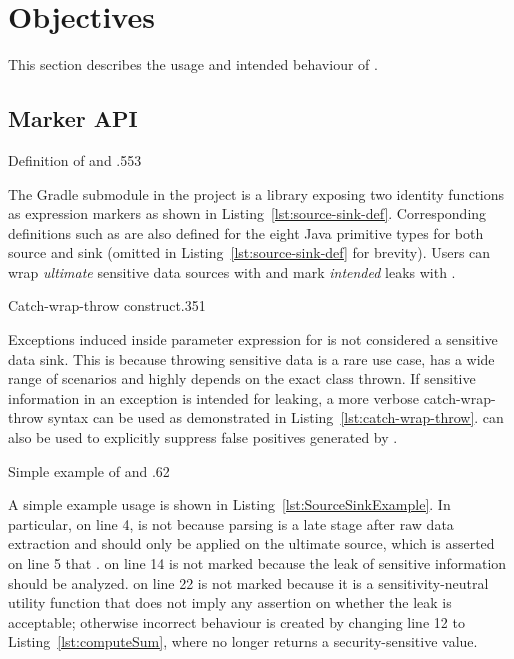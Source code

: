\section{Objectives}\label{sec:objectives}
This section describes the usage and intended behaviour of \pname{}.

\subsection{Marker API}\label{subsec:marker-api}
{Definition of  and }{.55}{3}

The  Gradle submodule in the project
is a library exposing two identity functions as expression markers
as shown in Listing~\ref{lst:source-sink-def}.
Corresponding definitions such as 
are also defined for the eight Java primitive types
for both source and sink (omitted in Listing~\ref{lst:source-sink-def} for brevity).
Users can wrap \emph{ultimate} sensitive data sources with 
and mark \emph{intended} leaks with .

{Catch-wrap-throw construct}{.35}{1}

Exceptions induced inside parameter expression for 
is not considered a sensitive data sink.
This is because throwing sensitive data is a rare use case,
has a wide range of scenarios
and highly depends on the exact class thrown.
If sensitive information in an exception is intended for leaking,
a more verbose catch-wrap-throw syntax can be used
as demonstrated in Listing~\ref{lst:catch-wrap-throw}.
 can also be used to explicitly suppress false positives generated by \pname{}.

{Simple example of  and }{.6}{2}

A simple example usage is shown in Listing~\ref{lst:SourceSinkExample}.
In particular, on line 4,  is not 
because parsing is a late stage after raw data extraction
and  should only be applied on the ultimate source,
which is asserted on line 5 that .
 on line 14 is not marked 
because the leak of sensitive information should be analyzed.
 on line 22 is not marked 
because it is a sensitivity-neutral utility function
that does not imply any assertion on whether the leak is acceptable;
otherwise incorrect behaviour is created by changing line 12 to Listing~\ref{lst:computeSum},
where  no longer returns a security-sensitive value.

